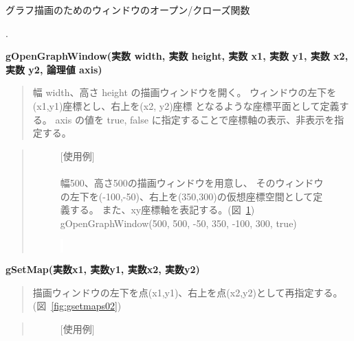 \documentclass[11pt,a4j]{jarticle}
\newcounter{enum2}
\newenvironment{enumerate2}{%
   \begin{list}%
   {%
      \arabic{enum2}.\ \,%
   }%
   {%
      \usecounter{enum2}
      \setlength{\itemindent}{0zw}%
      \setlength{\leftmargin}{3zw}%
      \setlength{\rightmargin}{0zw}%
      \setlength{\labelsep}{0zw}%
      \setlength{\labelwidth}{3zw}%
      \setlength{\itemsep}{0em}%
      \setlength{\parsep}{0em}%
      \setlength{\listparindent}{0zw}%
   }
}{%
   \end{list}%
}
\begin{document}
グラフ描画のためのウィンドウのオープン/クローズ関数 

\begin{enumerate2}
\item {\bf{gOpenGraphWindow(実数 width, 実数 height, 実数 x1, 実数 y1, 実数 x2, 実数 y2, 論理値 axis)}} \\
\vspace{-5mm}
   \begin{quotation}
   幅 width、高さ height の描画ウィンドウを開く。
   ウィンドウの左下を(x1,y1)座標とし、右上を(x2, y2)座標
   となるような座標平面として定義する。
   axis の値を true, false に指定することで座標軸の表示、非表示を指定する。
   \end{quotation}
   \begin{quotation}
\begin{figure}[!h]
\begin{center}
\begin{minipage}{24zw}
	   \noindent $[$使用例$]$\\
\ \\
幅500、高さ500の描画ウィンドウを用意し、
そのウィンドウの左下を(-100,-50)、右上を(350,300)の仮想座標空間として定義する。
また、xy座標軸を表記する。(図~\ref{fig:gopengraphwindow}) \\

{\small{gOpenGraphWindow(500, 500, -50, 350, -100, 300, true)}}
\end{minipage}
\begin{minipage}{20zw}
\begin{center}
\caption{$\!\!\!\!$\colorbox{white}{{\textcolor{white}{:}}}}
\label{fig:gopengraphwindow}
\end{center}
\end{minipage}
\end{center}
\end{figure}
   \end{quotation}


\item {\bf{gSetMap(実数x1, 実数y1, 実数x2, 実数y2)}} \\
  \begin{quotation}
     描画ウィンドウの左下を点(x1,y1)、右上を点(x2,y2)として再指定する。
     (図~\ref{fig:gsetmaps02})\\
  \end{quotation}
\begin{quotation}
\begin{figure}[!h]
\begin{minipage}{25zw}
\noindent $[$使用例$]$ \\


\end{minipage}
\end{figure}
\end{quotation}
\end{enumerate2}
\end{document}
